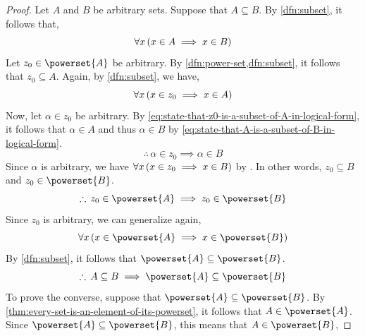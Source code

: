\begin{proof}
    Let \( A \) and \( B \) be arbitrary sets. Suppose that \( A \subseteq B \). By \cref{dfn:subset}, it
    follows that,
    \begin{equation}
        \label{eq:state-that-A-is-a-subset-of-B-in-logical-form}
        \forall x \, \mleft( x \in A \implies x \in B \mright)
    \end{equation}
    Let \( z_{0} \in \powerset{A} \) be arbitrary. By \cref{dfn:power-set,dfn:subset}, it follows that
    \( z_{0} \subseteq A \). Again, by \cref{dfn:subset}, we have,
    \begin{equation}
        \label{eq:state-that-z0-is-a-subset-of-A-in-logical-form}
        \forall x \, \mleft( x \in z_{0} \implies x \in A \mright)
    \end{equation}
    Now, let \( \alpha \in z_{0} \) be arbitrary. By \eqref{eq:state-that-z0-is-a-subset-of-A-in-logical-form},
    it follows that \( \alpha \in A \) and thus \( \alpha \in B \) by \eqref{eq:state-that-A-is-a-subset-of-B-in-logical-form}.
    \begin{equation*}
        \therefore \, \alpha \in z_{0} \implies \alpha \in B
    \end{equation*}
    Since \( \alpha \) is arbitrary, we have \( \forall x \, \mleft( x \in z_{0} \implies x \in B \mright) \) by .
    In other words, \( z_{0} \subseteq B \) and \( z_{0} \in \powerset{B} \).
    \begin{equation*}
        \therefore \, z_{0} \in \powerset{A} \implies z_{0} \in \powerset{B}
    \end{equation*}
    Since \( z_{0} \) is arbitrary, we can generalize again,
    \begin{equation*}
        \forall x \, \mleft( x \in \powerset{A} \implies x \in \powerset{B} \mright)
    \end{equation*}
    By \cref{dfn:subset}, it follows that \( \powerset{A} \subseteq \powerset{B} \).
    \begin{equation}
        \label{eq:A-subset-B-implies-powerset-A-subset-powerset-B}
        \therefore \, A \subseteq B \implies \powerset{A} \subseteq \powerset{B}
    \end{equation}
    To prove the converse, suppose that \( \powerset{A} \subseteq \powerset{B} \). By \cref{thm:every-set-is-an-element-of-its-powerset},
    it follows that \( A \in \powerset{A} \). Since \( \powerset{A} \subseteq \powerset{B} \), this means that \( A \in \powerset{B} \),

\end{proof}

